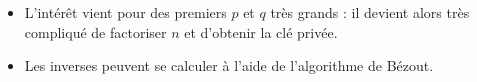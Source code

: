 	\begin{remark}
		\begin{itemize}
			\item L'intérêt vient pour des premiers $p$ et $q$ très grands : il devient alors très compliqué de factoriser $n$ et d'obtenir la clé privée.
			\item Les inverses peuvent se calculer à l'aide de l'algorithme de Bézout.
		\end{itemize}
	\end{remark}

